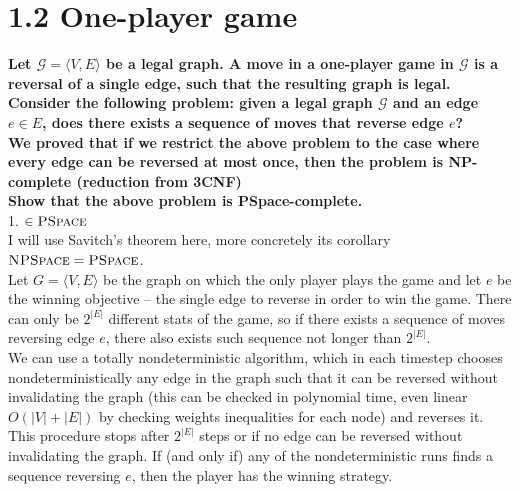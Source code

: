 \section*{1.2 One-player game}
\textbf{Let $\mathcal{G} = \langle V, E \rangle$ be a legal graph. A move in a one-player game in $\mathcal{G}$
is a reversal of a single edge, such that the resulting graph is legal.\\
Consider the following problem: given a legal graph $\mathcal{G}$ and an edge $e \in E$, does there exists
a sequence of moves that reverse edge $e$?\\
We proved that if we restrict the above problem to the case where every edge
can be reversed at most once, then the problem is NP-complete (reduction
from 3CNF)\\
Show that the above problem is PSpace-complete.}\\
1. \underline{$\in \textsc{PSpace}$}\\
I will use Savitch's theorem here, more concretely its corollary $\textsc{NPSpace} = \textsc{PSpace}$.\\
Let $G = \langle V, E \rangle$ be the graph on which the only player plays the game and let $e$ be the
winning objective -- the single edge to reverse in order to win the game. There can only be $2^{|E|}$
different stats of the game, so if there exists a sequence of moves reversing edge $e$, there also
exists such sequence not longer than $2^{|E|}$.\\
We can use a totally nondeterministic algorithm, which in each timestep chooses nondeterministically
any edge in the graph such that it can be reversed without invalidating the graph (this can be checked
in polynomial time, even linear $O(|V|+|E|)$ by checking weights inequalities for each node) and reverses it.
This procedure stops after $2^{|E|}$ steps or if no edge can be reversed without invalidating the graph.
If (and only if) any of the nondeterministic runs finds a sequence reversing $e$, then the player has
the winning strategy.\\

